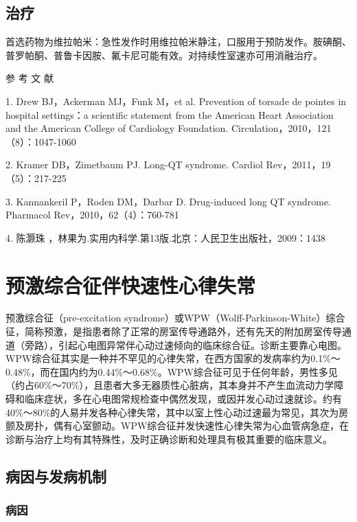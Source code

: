 \subsection{治疗}

首选药物为维拉帕米：急性发作时用维拉帕米静注，口服用于预防发作。胺碘酮、普罗帕酮、普鲁卡因胺、氟卡尼可能有效。对持续性室速亦可用消融治疗。

\hypertarget{text00293.htmlux5cux23CHP10-2-6-2-4}{}
参 考 文 献

1. Drew BJ，Ackerman MJ，Funk M，et al. Prevention of torsade de pointes
in hospital settings：a scientific statement from the American Heart
Association and the American College of Cardiology Foundation.
Circulation，2010，121（8）：1047-1060

2. Kramer DB，Zimetbaum PJ. Long-QT syndrome. Cardiol
Rev，2011，19（5）：217-225

3. Kannankeril P，Roden DM，Darbar D. Drug-induced long QT syndrome.
Pharmacol Rev，2010，62（4）：760-781

4. 陈灏珠 ，林果为.实用内科学.第13版.北京：人民卫生出版社，2009：1438

\protect\hypertarget{text00294.html}{}{}

\section{预激综合征伴快速性心律失常}

预激综合征（pre-excitation
syndrome）或WPW（Wolff-Parkinson-White）综合征，简称预激，是指患者除了正常的房室传导通路外，还有先天的附加房室传导通道（旁路），引起心电图异常伴心动过速倾向的临床综合征。诊断主要靠心电图。WPW综合征其实是一种并不罕见的心律失常，在西方国家的发病率约为0.1\%～0.48\%，而在国内约为0.44\%～0.68\%。WPW综合征可见于任何年龄，男性多见（约占60\%～70\%），且患者大多无器质性心脏病，其本身并不产生血流动力学障碍和临床症状，多在心电图常规检查中偶然发现，或因并发心动过速就诊。约有40\%～80\%的人易并发各种心律失常，其中以室上性心动过速最为常见，其次为房颤及房扑，偶有心室颤动。WPW综合征并发快速性心律失常为心血管病急症，在诊断与治疗上均有其特殊性，及时正确诊断和处理具有极其重要的临床意义。

\subsection{病因与发病机制}

\subsubsection{病因}

